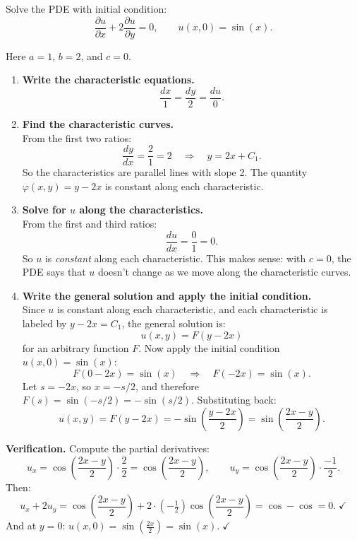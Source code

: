 \exampleline
\begin{example}
Solve the PDE with initial condition:
\[
\frac{\partial u}{\partial x} + 2\frac{\partial u}{\partial y} = 0, \qquad u(x,0) = \sin(x).
\]

\begin{solution}
Here \( a = 1 \), \( b = 2 \), and \( c = 0 \).

\begin{enumerate}
    \item \textbf{Write the characteristic equations.} \\
    \[
    \frac{dx}{1} = \frac{dy}{2} = \frac{du}{0}.
    \]

    \item \textbf{Find the characteristic curves.} \\
    From the first two ratios:
    \[
    \frac{dy}{dx} = \frac{2}{1} = 2 \quad \Longrightarrow \quad y = 2x + C_1.
    \]
    So the characteristics are parallel lines with slope 2. The quantity \( \varphi(x,y) = y - 2x \) is constant along each characteristic.

    \item \textbf{Solve for \( u \) along the characteristics.} \\
    From the first and third ratios:
    \[
    \frac{du}{dx} = \frac{0}{1} = 0.
    \]
    So \( u \) is \textit{constant} along each characteristic. This makes sense: with \( c = 0 \), the PDE says that \( u \) doesn't change as we move along the characteristic curves.

    \item \textbf{Write the general solution and apply the initial condition.} \\
    Since \( u \) is constant along each characteristic, and each characteristic is labeled by \( y - 2x = C_1 \), the general solution is:
    \[
    u(x,y) = F(y - 2x)
    \]
    for an arbitrary function \( F \). Now apply the initial condition \( u(x,0) = \sin(x) \):
    \[
    F(0 - 2x) = \sin(x) \quad \Longrightarrow \quad F(-2x) = \sin(x).
    \]
    Let \( s = -2x \), so \( x = -s/2 \), and therefore \( F(s) = \sin(-s/2) = -\sin(s/2) \). Substituting back:
    \[
    u(x,y) = F(y - 2x) = -\sin\!\left(\frac{y - 2x}{2}\right) = \boxed{\sin\!\left(\frac{2x - y}{2}\right)}.
    \]
\end{enumerate}

\noindent \textbf{Verification.} Compute the partial derivatives:
\[
u_x = \cos\!\left(\frac{2x - y}{2}\right) \cdot \frac{2}{2} = \cos\!\left(\frac{2x - y}{2}\right), \qquad u_y = \cos\!\left(\frac{2x - y}{2}\right) \cdot \frac{-1}{2}.
\]
Then:
\[
u_x + 2u_y = \cos\!\left(\frac{2x-y}{2}\right) + 2 \cdot \left(-\tfrac{1}{2}\right)\cos\!\left(\frac{2x-y}{2}\right) = \cos - \cos = 0. \;\checkmark
\]
And at \( y = 0 \): \( u(x,0) = \sin\!\left(\frac{2x}{2}\right) = \sin(x). \;\checkmark \)
\end{solution}
\end{example}
\exampleline

